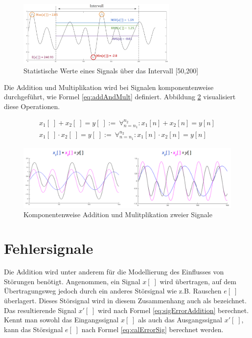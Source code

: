 \begin{figure}[h]
	\centering
	\includegraphics[width=0.7\textwidth]{bilder/sigStats02.png}
	\caption{Statistische Werte eines Signals über das Intervall [50,200]}
	\label{img:sigStats}
\end{figure}

Die Addition und Multiplikation wird bei Signalen komponentenweise durchgeführt, wie Formel \ref{eq:addAndMult} definiert.  Abbildung \ref{img:addAndMultSig} visualisiert diese Operationen. 

\begin{equation}
\begin{gathered} 
x_1[\;] + x_2[\;] = y[\;] :=\ \mathop{\forall}_{n = n_1}^{n_2}  :  x_1[n] + x_2[n] = y[n] \\
x_1[\;] \cdot x_2[\;] = y[\;] :=\ \mathop{\forall}_{n = n_1}^{n_2}  :  x_1[n] \cdot x_2[n] = y[n]
\end{gathered}
\label{eq:addAndMult}
\end{equation}

\begin{figure}[h]
	\centering
	\includegraphics[width=1\textwidth]{bilder/addAndMultSig02.png}
	\caption{Komponentenweise Addition und Mulitplikation zweier Signale}
	\label{img:addAndMultSig}
\end{figure}

\section{Fehlersignale}

Die Addition wird unter anderem für die Modellierung des Einflusses von Störungen benötigt. Angenommen, ein Signal $x[\;]$ wird übertragen, auf dem Übertragungsweg jedoch durch ein anderes Störsignal wie z.B. Rauschen $e[\;]$ überlagert. Dieses Störsignal wird in diesem Zusammenhang auch als  bezeichnet. Das resultierende Signal $x'[\;]$ wird nach Formel \ref{eq:sigErrorAddition} berechnet. Kennt man sowohl das Eingangssignal $x[\;]$ als auch das Ausgangssignal $x'[\;]$, kann das Störsignal $e[\;]$ nach Formel \ref{eq:calErrorSig} berechnet werden.


